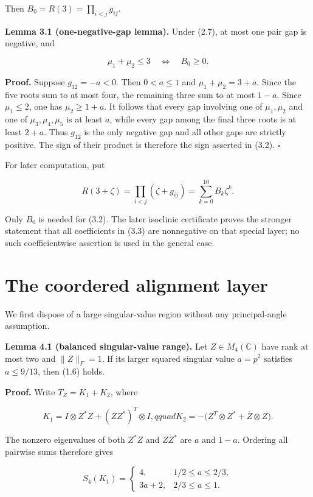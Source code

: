\documentclass[11pt]{article}
\begin{document}
Then $B_0=R(3)=\prod_{i<j}g_{ij}$.

\textbf{Lemma 3.1 (one-negative-gap lemma).} Under (2.7), at most one pair gap is negative, and

\begin{equation}
\mu_1+\mu_2\le3\quad\Longleftrightarrow\quad B_0\ge0.
\tag{3.2}
\end{equation}

\textbf{Proof.} Suppose $g_{12}=-a<0$. Then $0<a\le1$ and $\mu_1+\mu_2=3+a$. Since the five roots sum to at most four, the remaining three sum to at most $1-a$. Since $\mu_1\le2$, one has $\mu_2\ge1+a$. It follows that every gap involving one of $\mu_1,\mu_2$ and one of $\mu_3,\mu_4,\mu_5$ is at least $a$, while every gap among the final three roots is at least $2+a$. Thus $g_{12}$ is the only negative gap and all other gaps are strictly positive. The sign of their product is therefore the sign asserted in (3.2). $\square$

For later computation, put

\begin{equation}
R(3+\zeta)=\prod_{i<j}(\zeta+g_{ij})
=\sum_{k=0}^{10}B_k\zeta^k.
\tag{3.3}
\end{equation}

Only $B_0$ is needed for (3.2). The later isoclinic certificate proves the stronger statement that all coefficients in (3.3) are nonnegative on that special layer; no such coefficientwise assertion is used in the general case.

\section{The coordered alignment layer}

We first dispose of a large singular-value region without any principal-angle assumption.

\textbf{Lemma 4.1 (balanced singular-value range).} Let $Z\in M_4(\mathbb C)$ have rank at most two and $\|Z\|_F=1$. If its larger squared singular value $a=p^2$ satisfies $a\le9/13$, then (1.6) holds.

\textbf{Proof.} Write $T_Z=K_1+K_2$, where

\[
K_1=I\otimes Z^*Z+(ZZ^*)^T\otimes I,qquad
K_2=-\bigl(Z^T\otimes Z^*+\overline Z\otimes Z\bigr).
\]

The nonzero eigenvalues of both $Z^*Z$ and $ZZ^*$ are $a$ and $1-a$. Ordering all pairwise sums therefore gives

\[
S_4(K_1)=
\begin{cases}
4,&1/2\le a\le2/3,\\
3a+2,&2/3\le a\le1.
\end{cases}
\]
\end{document}
